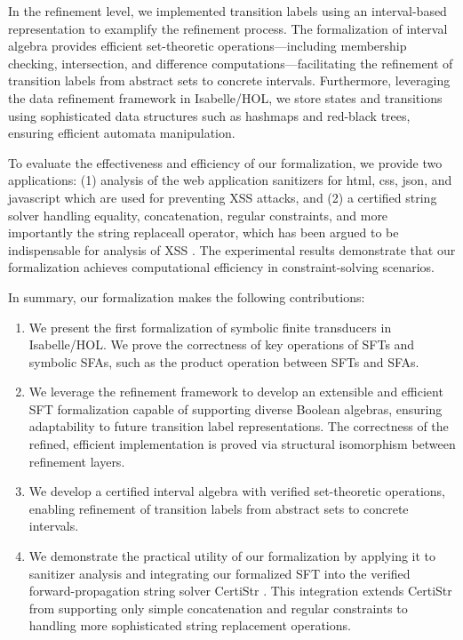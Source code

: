 In the refinement level, we implemented transition labels using an interval-based representation to examplify the refinement process. The formalization of interval algebra provides efficient set-theoretic operations—including membership checking, intersection, and difference computations—facilitating the refinement of transition labels from abstract sets to concrete intervals. Furthermore, leveraging the data refinement framework \cite{DBLP:conf/itp/Lammich13} in Isabelle/HOL, we store states and transitions using sophisticated data structures such as hashmaps and red-black trees, ensuring efficient automata manipulation.

To evaluate the effectiveness and efficiency of our formalization, we 
provide two applications: (1) analysis of the web application sanitizers for html, css, json, and javascript
which are used for preventing XSS attacks, and (2) a certified string solver handling equality, concatenation, regular
constraints, and more importantly the string replaceall operator, which has been
argued to be indispensable for analysis of XSS
\cite{DBLP:conf/popl/LinB16,Kern,Berkeley-JavaScript,systematic-transduction,uss/HooimeijerLMSV11}.
The experimental results demonstrate that our formalization achieves computational efficiency in constraint-solving scenarios.




In summary, our formalization makes the following contributions:
\begin{enumerate}
\item We present the first formalization of symbolic finite transducers  in Isabelle/HOL.
We prove the correctness of key operations of SFTs and symbolic SFAs, such as the product operation between SFTs and SFAs.
\item We leverage the refinement framework to develop an extensible and efficient SFT formalization capable of supporting diverse Boolean algebras, ensuring adaptability to future transition label representations. The correctness of the refined, efficient implementation is proved via structural isomorphism between refinement layers.
\item We develop a certified interval algebra with verified set-theoretic operations, enabling refinement of transition labels from abstract sets to concrete intervals.
\item We demonstrate the practical utility of our formalization by applying it to sanitizer analysis and integrating our formalized SFT into the verified forward-propagation string solver CertiStr \cite{cpp/KanLRS22}. This integration extends CertiStr from supporting only simple concatenation and regular constraints to handling more sophisticated string replacement operations.
\end{enumerate}

